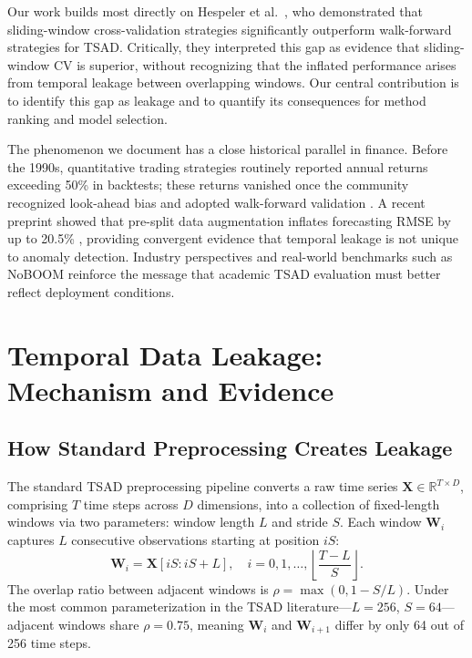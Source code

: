 \documentclass[preprint,12pt]{elsarticle}
\begin{document}
Our work builds most directly on Hespeler et al.\ \cite{hespeler2025temporal}, who demonstrated that sliding-window cross-validation strategies significantly outperform walk-forward strategies for TSAD. Critically, they interpreted this gap as evidence that sliding-window CV is superior, without recognizing that the inflated performance arises from temporal leakage between overlapping windows. Our central contribution is to identify this gap as leakage and to quantify its consequences for method ranking and model selection.

The phenomenon we document has a close historical parallel in finance. Before the 1990s, quantitative trading strategies routinely reported annual returns exceeding 50\% in backtests; these returns vanished once the community recognized look-ahead bias and adopted walk-forward validation \cite{deprado2018advances,bailey2014pseudo}. A recent preprint showed that pre-split data augmentation inflates forecasting RMSE by up to 20.5\% \cite{leakage_augmentation2025}, providing convergent evidence that temporal leakage is not unique to anomaly detection. Industry perspectives \cite{openchallenges2025} and real-world benchmarks such as NoBOOM \cite{noboom2025} reinforce the message that academic TSAD evaluation must better reflect deployment conditions.

\section{Temporal Data Leakage: Mechanism and Evidence}
\label{sec:leakage}

\subsection{How Standard Preprocessing Creates Leakage}

The standard TSAD preprocessing pipeline converts a raw time series $\mathbf{X} \in \mathbb{R}^{T \times D}$, comprising $T$ time steps across $D$ dimensions, into a collection of fixed-length windows via two parameters: window length $L$ and stride $S$. Each window $\mathbf{W}_i$ captures $L$ consecutive observations starting at position $iS$:
\begin{equation}
\mathbf{W}_i = \mathbf{X}[iS : iS + L], \quad i = 0, 1, \ldots, \left\lfloor\frac{T - L}{S}\right\rfloor.
\end{equation}
The overlap ratio between adjacent windows is $\rho = \max(0, 1 - S/L)$. Under the most common parameterization in the TSAD literature---$L = 256$, $S = 64$---adjacent windows share $\rho = 0.75$, meaning $\mathbf{W}_i$ and $\mathbf{W}_{i+1}$ differ by only 64 out of 256 time steps.
\end{document}
